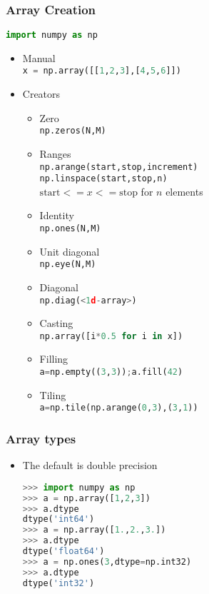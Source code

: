 \documentclass[xcolor=table,10pt,final]{beamer}
\begin{document}
\begin{frame}[fragile]
  \frametitle{Array Creation}
  \lstinline[language=python]|import numpy as np|
  \begin{itemize}
    \item Manual\\
      \lstinline[language=python]|x = np.array([[1,2,3],[4,5,6]])|
    \item Creators
      \begin{itemize}
        \item Zero\\
          \lstinline[language=python]|np.zeros(N,M)|
        \item Ranges\\
          \lstinline[language=python]|np.arange(start,stop,increment)|\\
          \lstinline[language=python]|np.linspace(start,stop,n)|\\
          {\tt $\mathrm{start} <= x <= \mathrm{stop}$} for $n$ elements
        \item Identity\\
          \lstinline[language=python]|np.ones(N,M)|
        \item Unit diagonal\\
          \lstinline[language=python]|np.eye(N,M)|
        \item Diagonal\\
          \lstinline[language=python]|np.diag(<1d-array>)|
        \item Casting\\
          \lstinline[language=python]|np.array([i*0.5 for i in x])|
        \item Filling\\
          \lstinline[language=python]|a=np.empty((3,3));a.fill(42)|
        \item Tiling\\
          \lstinline[language=python]|a=np.tile(np.arange(0,3),(3,1))|

      \end{itemize}
  \end{itemize}
\end{frame}


\begin{frame}[fragile]
  \frametitle{Array types}
  \begin{itemize}
    \item The default is double precision\\
      \begin{lstlisting}[language=python]
>>> import numpy as np
>>> a = np.array([1,2,3])
>>> a.dtype
dtype('int64')
>>> a = np.array([1.,2.,3.])
>>> a.dtype
dtype('float64')
>>> a = np.ones(3,dtype=np.int32)
>>> a.dtype
dtype('int32')
      \end{lstlisting}
  \end{itemize}
\end{frame}
\end{document}
